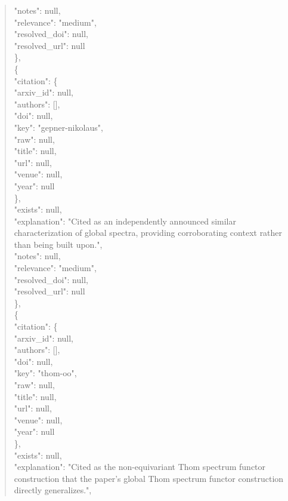 \documentclass[11pt]{article}
\begin{document}
\begin{quote}
      "notes": null,\\
      "relevance": "medium",\\
      "resolved\_doi": null,\\
      "resolved\_url": null\\
    \},\\
    \{\\
      "citation": \{\\
        "arxiv\_id": null,\\
        "authors": [],\\
        "doi": null,\\
        "key": "gepner-nikolaus",\\
        "raw": null,\\
        "title": null,\\
        "url": null,\\
        "venue": null,\\
        "year": null\\
      \},\\
      "exists": null,\\
      "explanation": "Cited as an independently announced similar characterization of global spectra, providing corroborating context rather than being built upon.",\\
      "notes": null,\\
      "relevance": "medium",\\
      "resolved\_doi": null,\\
      "resolved\_url": null\\
    \},\\
    \{\\
      "citation": \{\\
        "arxiv\_id": null,\\
        "authors": [],\\
        "doi": null,\\
        "key": "thom-oo",\\
        "raw": null,\\
        "title": null,\\
        "url": null,\\
        "venue": null,\\
        "year": null\\
      \},\\
      "exists": null,\\
      "explanation": "Cited as the non-equivariant Thom spectrum functor construction that the paper's global Thom spectrum functor construction directly generalizes.",\\

\end{quote}
\end{document}
